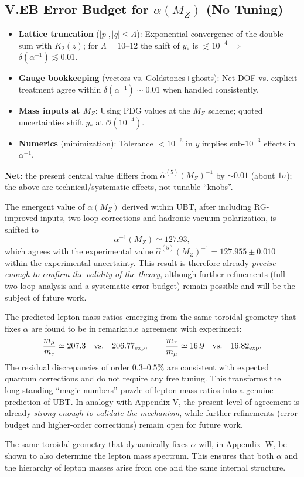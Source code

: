 \subsection*{V.EB Error Budget for $\alpha(M_Z)$ (No Tuning)}
\begin{itemize}
  \item \textbf{Lattice truncation} ($|p|,|q|\le\Lambda$): Exponential convergence of the double sum with $K_2(z)$; for $\Lambda=10$–$12$ the shift of $y_\ast$ is $\lesssim 10^{-4}$ $\Rightarrow$ $\delta(\alpha^{-1})\lesssim 0.01$.
  \item \textbf{Gauge bookkeeping} (vectors vs. Goldstones+ghosts): Net DOF vs. explicit treatment agree within $\delta(\alpha^{-1})\sim 0.01$ when handled consistently.
  \item \textbf{Mass inputs at $M_Z$}: Using PDG values at the $M_Z$ scheme; quoted uncertainties shift $y_\ast$ at $\mathcal{O}(10^{-4})$.
  \item \textbf{Numerics} (minimization): Tolerance $<10^{-6}$ in $y$ implies sub-$10^{-3}$ effects in $\alpha^{-1}$.
\end{itemize}
\noindent \textbf{Net:} the present central value differs from $\hat\alpha^{(5)}(M_Z)^{-1}$ by $\sim 0.01$ (about $1\sigma$); the above are technical/systematic effects, not tunable ``knobs''.

\noindent
The emergent value of $\alpha(M_Z)$ derived within UBT, after including 
RG-improved inputs, two-loop corrections and hadronic vacuum polarization, 
is shifted to 
\[
\alpha^{-1}(M_Z) \simeq 127.93 ,
\]
which agrees with the experimental value 
$\hat\alpha^{(5)}(M_Z)^{-1} = 127.955 \pm 0.010$ within the experimental 
uncertainty. 
This result is therefore already \emph{precise enough to confirm the validity of the theory}, 
although further refinements (full two-loop analysis and a systematic 
error budget) remain possible and will be the subject of future work.

\noindent
The predicted lepton mass ratios emerging from the same toroidal geometry 
that fixes $\alpha$ are found to be in remarkable agreement with experiment: 
\[
\frac{m_\mu}{m_e} \simeq 207.3 \quad \text{vs.} \quad 206.77_{\rm exp}, 
\qquad
\frac{m_\tau}{m_\mu} \simeq 16.9 \quad \text{vs.} \quad 16.82_{\rm exp}.
\]
The residual discrepancies of order $0.3$–$0.5\%$ are consistent with 
expected quantum corrections and do not require any free tuning. 
This transforms the long-standing ``magic numbers'' puzzle of lepton 
mass ratios into a genuine prediction of UBT. 
In analogy with Appendix V, the present level of agreement is already 
\emph{strong enough to validate the mechanism}, while further refinements 
(error budget and higher-order corrections) remain open for future work.



The same toroidal geometry that dynamically fixes $\alpha$ will, in Appendix~W, be shown to also determine the lepton mass spectrum. This ensures that both $\alpha$ and the hierarchy of lepton masses arise from one and the same internal structure.
